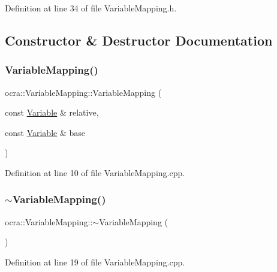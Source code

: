 Definition at line 34 of file Variable\+Mapping.\+h.



\subsection{Constructor \& Destructor Documentation}
\hypertarget{classocra_1_1VariableMapping_a05d5789ef9b868666a9e1eaf1294369c}{}\label{classocra_1_1VariableMapping_a05d5789ef9b868666a9e1eaf1294369c} 
\subsubsection{\texorpdfstring{Variable\+Mapping()}{VariableMapping()}}
{\footnotesize\ttfamily ocra\+::\+Variable\+Mapping\+::\+Variable\+Mapping (\begin{DoxyParamCaption}\item[{const \hyperlink{classocra_1_1Variable}{Variable} \&}]{relative,  }\item[{const \hyperlink{classocra_1_1Variable}{Variable} \&}]{base }\end{DoxyParamCaption})}



Definition at line 10 of file Variable\+Mapping.\+cpp.

\hypertarget{classocra_1_1VariableMapping_ad27dd236ac480197c10f8bb9ab15b6bd}{}\label{classocra_1_1VariableMapping_ad27dd236ac480197c10f8bb9ab15b6bd} 
\subsubsection{\texorpdfstring{$\sim$\+Variable\+Mapping()}{~VariableMapping()}}
{\footnotesize\ttfamily ocra\+::\+Variable\+Mapping\+::$\sim$\+Variable\+Mapping (\begin{DoxyParamCaption}{ }\end{DoxyParamCaption})}



Definition at line 19 of file Variable\+Mapping.\+cpp.



